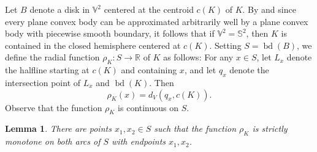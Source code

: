 \documentclass[twoside]{amsart}
\theoremstyle{plain}
\newtheorem{lemma}[theorem]{Lemma}
\theoremstyle{definition}
\numberwithin{equation}{section}
\renewcommand{\Re}{\mathbb R}
\newcommand{\Sph}{\mathbb{S}}
\newcommand{\V}{\mathbb{V}}
\DeclareMathOperator{\bd}{bd}
\begin{document}
Let $B$ denote a disk in $\V^2$ centered at the centroid $c(K)$ of $K$. By \cite[Lemma 4.4]{BHLL} and since every plane convex body can be approximated arbitrarily well by a plane convex body with piecewise smooth boundary, it follows that if $\V^2 = \Sph^2$, then $K$ is contained in the closed hemisphere centered at $c(K)$.
Setting $S=\bd(B)$, we define the radial function $\rho_K : S \to \Re$ of $K$ as follows: For any $x \in S$, let $L_x$ denote the halfline starting at $c(K)$ and containing $x$, and let $q_x$ denote the intersection point of $L_x$ and $\bd(K)$. Then
\[
\rho_K(x) = d_V(q_x,c(K)).
\]
Observe that the function $\rho_K$ is continuous on $S$.

\begin{lemma}\label{lem:monotonicity}
There are points $x_1,x_2 \in S$ such that the function $\rho_K$ is strictly monotone on both arcs of $S$ with endpoints $x_1, x_2$.
\end{lemma}
\end{document}
